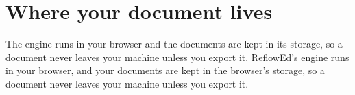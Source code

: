 \documentclass[11pt]{article}
\theoremstyle{definition}
\begin{document}
\section{Where your document lives}\label{sec:store}

The engine runs in your browser and the documents are kept in its storage, so a document never leaves your machine unless you export it.
ReflowEd's engine runs in your browser, and your documents are kept in the browser's storage, so a document never leaves your machine unless you export it.


\end{document}
